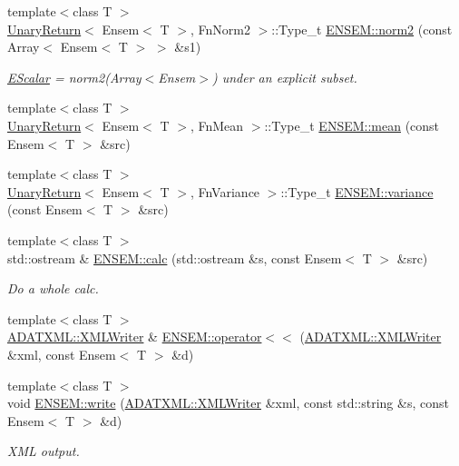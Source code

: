 \begin{DoxyCompactItemize}
{\footnotesize template$<$class T $>$ }\\\mbox{\hyperlink{structUnaryReturn}{Unary\+Return}}$<$ Ensem$<$ T $>$, Fn\+Norm2 $>$\+::Type\+\_\+t \mbox{\hyperlink{namespaceENSEM_a67904e4929712a1fa81e70ed7980c05b}{E\+N\+S\+E\+M\+::norm2}} (const Array$<$ Ensem$<$ T $>$ $>$ \&s1)
\begin{DoxyCompactList}\small\item\em \mbox{\hyperlink{classENSEM_1_1EScalar}{E\+Scalar}} = norm2(\+Array$<$\+Ensem$>$) under an explicit subset. \end{DoxyCompactList}\item 
{\footnotesize template$<$class T $>$ }\\\mbox{\hyperlink{structUnaryReturn}{Unary\+Return}}$<$ Ensem$<$ T $>$, Fn\+Mean $>$\+::Type\+\_\+t \mbox{\hyperlink{namespaceENSEM_a57df5bdf8770d89f824a3898e08c2d81}{E\+N\+S\+E\+M\+::mean}} (const Ensem$<$ T $>$ \&src)
\item 
{\footnotesize template$<$class T $>$ }\\\mbox{\hyperlink{structUnaryReturn}{Unary\+Return}}$<$ Ensem$<$ T $>$, Fn\+Variance $>$\+::Type\+\_\+t \mbox{\hyperlink{namespaceENSEM_a0745a1a4b4007ac858d64767bed5f6d4}{E\+N\+S\+E\+M\+::variance}} (const Ensem$<$ T $>$ \&src)
\item 
{\footnotesize template$<$class T $>$ }\\std\+::ostream \& \mbox{\hyperlink{namespaceENSEM_a6bddab1f5c5944deb2e2e9340fa6df10}{E\+N\+S\+E\+M\+::calc}} (std\+::ostream \&s, const Ensem$<$ T $>$ \&src)
\begin{DoxyCompactList}\small\item\em Do a whole calc. \end{DoxyCompactList}\item 
{\footnotesize template$<$class T $>$ }\\\mbox{\hyperlink{classADATXML_1_1XMLWriter}{A\+D\+A\+T\+X\+M\+L\+::\+X\+M\+L\+Writer}} \& \mbox{\hyperlink{namespaceENSEM_a88d3bf4c2ceeffc73f878f8236fc624e}{E\+N\+S\+E\+M\+::operator$<$$<$}} (\mbox{\hyperlink{classADATXML_1_1XMLWriter}{A\+D\+A\+T\+X\+M\+L\+::\+X\+M\+L\+Writer}} \&xml, const Ensem$<$ T $>$ \&d)
\item 
{\footnotesize template$<$class T $>$ }\\void \mbox{\hyperlink{namespaceENSEM_abde35864d26ad5898166c7b3377e5a61}{E\+N\+S\+E\+M\+::write}} (\mbox{\hyperlink{classADATXML_1_1XMLWriter}{A\+D\+A\+T\+X\+M\+L\+::\+X\+M\+L\+Writer}} \&xml, const std\+::string \&s, const Ensem$<$ T $>$ \&d)
\begin{DoxyCompactList}\small\item\em X\+ML output. \end{DoxyCompactList}\item 

\end{DoxyCompactItemize}
